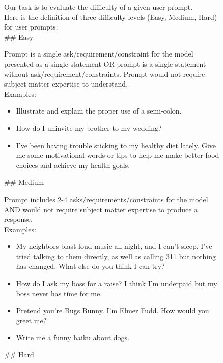 \begin{figure}

\small
\begin{framed}

Our task is to evaluate the difficulty of a given user prompt. \\
Here is the definition of three difficulty levels (Easy, Medium, Hard) for user prompts:\\


\#\# Easy

Prompt is a single ask/requirement/constraint for the model presented as a single statement OR prompt is a single statement without ask/requirement/constraints.
Prompt would not require subject matter expertise to understand. \\

Examples:
\begin{itemize}
\item Illustrate and explain the proper use of a semi-colon.
\item How do I uninvite my brother to my wedding?
\item I've been having trouble sticking to my healthy diet lately. Give me some motivational words or tips to help me make better food choices and achieve my health goals.
\end{itemize}

\vspace{5mm}

\#\# Medium

Prompt includes 2-4 asks/requirements/constraints for the model AND would not require subject matter expertise to produce a response. \\

Examples:
\begin{itemize}
\item My neighbors blast loud music all night, and I can’t sleep. I’ve tried talking to them directly, as well as calling 311 but nothing has changed. What else do you think I can try?
\item How do I ask my boss for a raise? I think I’m underpaid but my boss never has time for me.
\item Pretend you’re Bugs Bunny. I’m Elmer Fudd. How would you greet me?
\item Write me a funny haiku about dogs.
\end{itemize}

\vspace{5mm}

\#\# Hard


\end{framed}
\end{figure}
